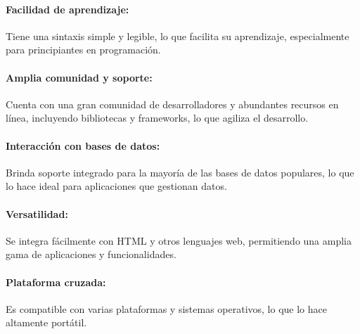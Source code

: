 \paragraph{Facilidad de aprendizaje:}
Tiene una sintaxis simple y legible, lo que facilita su aprendizaje, especialmente para principiantes en programación.
\paragraph{Amplia comunidad y soporte:}
Cuenta con una gran comunidad de desarrolladores y abundantes recursos en línea, incluyendo bibliotecas y frameworks, lo que agiliza el desarrollo.
\paragraph{Interacción con bases de datos:}
Brinda soporte integrado para la mayoría de las bases de datos populares, lo que lo hace ideal para aplicaciones que gestionan datos.
\paragraph{Versatilidad:}
Se integra fácilmente con HTML y otros lenguajes web, permitiendo una amplia gama de aplicaciones y funcionalidades.
\paragraph{Plataforma cruzada:}
Es compatible con varias plataformas y sistemas operativos, lo que lo hace altamente portátil.
